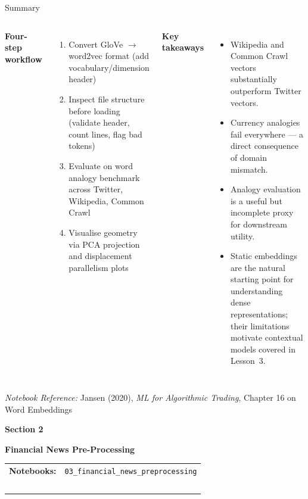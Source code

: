 \documentclass[11pt,aspectratio=169,professionalfonts]{beamer}
\begin{document}
\begin{frame}{Summary}

\begin{columns}[T]
\textbf{Four-step workflow}
\begin{enumerate}
  \item Convert GloVe $\to$ word2vec format
        (add vocabulary/dimension header)
  \item Inspect file structure before loading
        (validate header, count lines, flag bad tokens)
  \item Evaluate on word analogy benchmark
        across Twitter, Wikipedia, Common Crawl
  \item Visualise geometry via PCA projection
        and displacement parallelism plots
\end{enumerate}

\textbf{Key takeaways}
\begin{itemize}
  \item Wikipedia and Common Crawl vectors
        substantially outperform Twitter vectors.
  \item Currency analogies fail everywhere —
        a direct consequence of domain mismatch.
  \item Analogy evaluation is a useful but
        incomplete proxy for downstream utility.
  \item Static embeddings are the natural
        starting point for understanding dense
        representations; their limitations
        motivate contextual models covered
        in Lesson~3.
\end{itemize}
\end{columns}

\bigskip
\begin{center}
  \small
  \textit{Notebook Reference:} Jansen (2020), \emph{ML for Algorithmic Trading},
  Chapter 16 on Word Embeddings
\end{center}
\end{frame}
%
\begin{frame}[plain]
\centering
\vspace{1.0cm}
\LARGE{\textbf{Section 2}}
\vspace{0.5cm}

{\Huge \textbf{Financial News Pre-Processing}}

\vspace{1.5cm}

{\large
\begin{tabular}{@{}l l@{}}
\textbf{Notebooks:} 
& \texttt{03\_financial\_news\_preprocessing} \\[0.3em]
& \texttt{ }
\end{tabular}
}

\end{frame}
\end{document}
